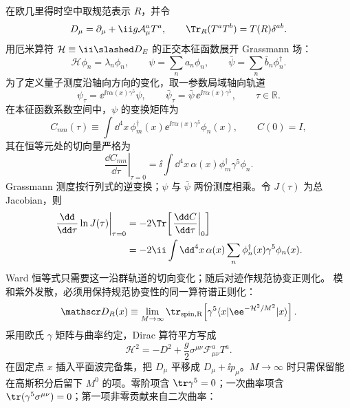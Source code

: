 \begin{derivation}
在欧几里得时空中取规范表示 $R$，并令
\begin{equation*}
 D_\mu=\partial_\mu+\ii g\mathcal A_\mu^aT^a,
 \qquad
 \Tr_R(T^aT^b)=T(R)\delta^{ab}.
\end{equation*}
用厄米算符 $\mathcal H\equiv\ii\slashed D_E$ 的正交本征函数展开 Grassmann 场：
\begin{equation*}
 \mathcal H\phi_n=\lambda_n\phi_n,
 \qquad
 \psi=\sum_na_n\phi_n,
 \qquad
 \bar\psi=\sum_n\bar b_n\phi_n^\dagger.
\end{equation*}
为了定义量子测度沿轴向方向的变化，取一参数局域轴向轨道
\begin{equation*}
 \psi_\tau=\ee^{\ii\tau\alpha(x)\gamma^5}\psi,
 \qquad
 \bar\psi_\tau=\bar\psi\,\ee^{\ii\tau\alpha(x)\gamma^5},
 \qquad \tau\in\mathbb R.
\end{equation*}
在本征函数系数空间中，$\psi$ 的变换矩阵为
\begin{equation*}
 C_{mn}(\tau)
 \equiv\int\dd^4x\,
 \phi_m^\dagger(x)\ee^{\ii\tau\alpha(x)\gamma^5}\phi_n(x),
 \qquad C(0)=I,
\end{equation*}
其在恒等元处的切向量严格为
\begin{equation*}
 \left.\frac{\dd C_{mn}}{\dd\tau}\right|_{\tau=0}
 =\ii\int\dd^4x\,
 \alpha(x)\phi_m^\dagger\gamma^5\phi_n.
\end{equation*}
Grassmann 测度按行列式的逆变换；$\psi$ 与 $\bar\psi$ 两份测度相乘。令 $J(\tau)$ 为总 Jacobian，则
\begin{align*}
 \left.\frac{\dd}{\dd\tau}\ln J(\tau)\right|_{\tau=0}
 &=-2\Tr\!\left[\left.\frac{\dd C}{\dd\tau}\right|_{0}\right]\\
 &=-2\ii\int\dd^4x\,\alpha(x)
 \sum_n\phi_n^\dagger(x)\gamma^5\phi_n(x).
\end{align*}
Ward 恒等式只需要这一沿群轨道的切向变化；随后对迹作规范协变正则化。
模和紫外发散，必须用保持规范协变性的同一算符谱正则化：
\begin{equation*}
 \mathscr D_R(x)
 \equiv\lim_{M\to\infty}
 \tr_{\rm spin,R}\!\left[
 \gamma^5\langle x|\ee^{-\mathcal H^2/M^2}|x\rangle
 \right].
\end{equation*}
采用欧氏 $\gamma$ 矩阵与曲率约定，Dirac 算符平方写成
\begin{equation*}
 \mathcal H^2=-D^2+\frac g2\sigma^{\mu\nu}\mathcal F_{\mu\nu}^aT^a.
\end{equation*}
在固定点 $x$ 插入平面波完备集，把 $D_\mu$ 平移成 $D_\mu+\ii p_\mu$。$M\to\infty$ 时只需保留能在高斯积分后留下 $M^0$ 的项。零阶项含 $\tr\gamma^5=0$；一次曲率项含 $\tr(\gamma^5\sigma^{\mu\nu})=0$；第一项非零贡献来自二次曲率：

\end{derivation}
